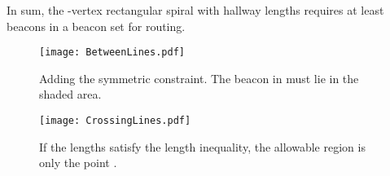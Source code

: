 \documentclass{article}
\begin{document}
In sum, the -vertex rectangular spiral with hallway lengths  requires at least  beacons in a beacon set for routing.


\begin{figure}[htb] 
	\begin{center}
		\texttt{[image: BetweenLines.pdf]} 
	\end{center}
	\caption{
		Adding the symmetric constraint.  The beacon
		in  must lie in the shaded area.
	}
	\label{fig:betweenLines}
\end{figure}  

\begin{figure}[htb] 
	\begin{center}
		\texttt{[image: CrossingLines.pdf]} 
	\end{center}
	\caption{
		If the lengths satisfy the length inequality, the allowable region is
		only the point .
	}\label{fig:crossingLines}
\end{figure}  
\end{document}
